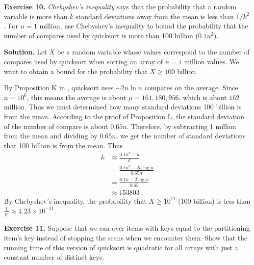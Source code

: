 \documentclass[12pt, a4paper]{article}
\newenvironment{ex}[2][Exercise]
{\par\medskip\noindent \textbf{#1 #2.}}
{\medskip}
\newenvironment{sol}[1][Solution]
{\par\medskip\noindent \textbf{#1.} }
{\medskip}
\begin{document}
	\begin{ex}{10}
		\emph{Chebyshev's inequality} says that the probability that a random variable is
		more than $k$ standard deviations away from the mean is less than $1/k^2$.
		For $n=1$ million, use Chebyshev's inequality to bound the probability that the
		number of compares used by quicksort is more than 100 billion ($0.1n^2)$.
	\end{ex}
	\begin{sol}
		Let $X$ be a random variable whose values correspond to the number of compares
		used by quicksort when sorting an array of $n=1$ million values. We want
		to obtain a bound for the probability that $X\geq 100$  billion.
		
		By Proposition K in \cite{sedgewick_wayne}, quicksort uses $\sim 2n\ln n$
		compares on the average. Since $n=10^6$, this means the average is
		about $\mu=161,180,956$, which is about $162$ million.
		Thus we must determined how many standard deviations 100 billion is from the mean.
		According to the proof of Proposition L, the standard deviation of the number of
		compare is about $0.65n$. Therefore, by subtracting 1 million from the mean
		and dividing by $0.65n$, we get the number of standard deviations that 100 billion
		is from the mean. Thus
		\begin{align*}
			k &\approx \frac{0.1n^2-\mu}{\sigma}\\
			&=\frac{0.1n^2 - 2n\log n}{0.65n}\\
			&=\frac{0.1n-2\log n}{0.65}\\
			&\approx 153803
		\end{align*}
		By Chebyshev's inequality, the probability that $X\geq 10^{11}$ (100 billion)
		is less than $\frac{1}{k^2}\approx 4.23\times 10^{-11}$.
	\end{sol}
	\begin{ex}{11}
		Suppose that we can over items with keys equal to the partitioning item's key
		instead of stopping the scans when we encounter them. Show that the running time of
		this version of quicksort is quadratic for all  arrays with just a constant
		number of distinct keys.
	\end{ex}
\end{document}
